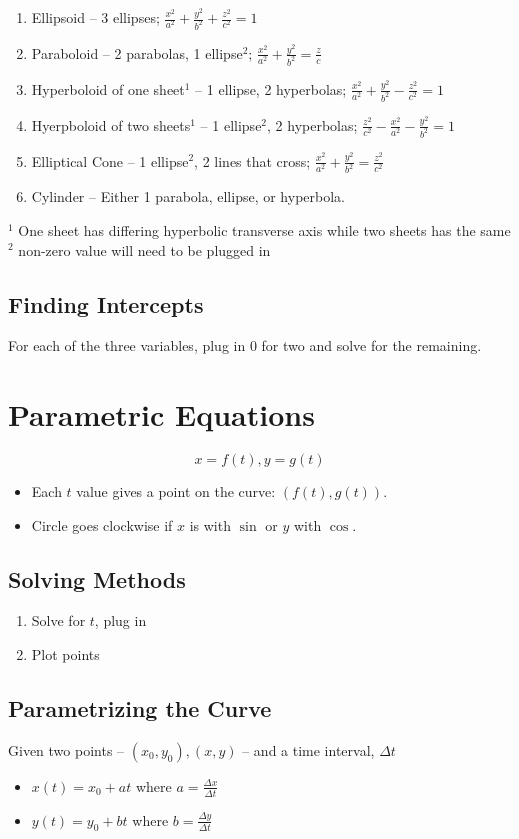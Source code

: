 \documentclass[12pt]{article}
\begin{document}
\begin{enumerate}
    \item Ellipsoid -- 3 ellipses; $\frac{x^2}{a^2}+\frac{y^2}{b^2}+\frac{z^2}{c^2}=1$
    \item Paraboloid -- 2 parabolas, 1 ellipse$^2$; $\frac{x^2}{a^2}+\frac{y^2}{b^2}=\frac{z}{c}$
    \item Hyperboloid of one sheet$^1$ -- 1 ellipse, 2 hyperbolas; $\frac{x^2}{a^2}+\frac{y^2}{b^2}-\frac{z^2}{c^2}=1$
    \item Hyerpboloid of two sheets$^1$ -- 1 ellipse$^2$, 2 hyperbolas; $\frac{z^2}{c^2}-\frac{x^2}{a^2}-\frac{y^2}{b^2}=1$
    \item Elliptical Cone -- 1 ellipse$^2$, 2 lines that cross; $\frac{x^2}{a^2}+\frac{y^2}{b^2}=\frac{z^2}{c^2}$
    \item Cylinder -- Either 1 parabola, ellipse, or hyperbola.
\end{enumerate}
$^1$ One sheet has differing hyperbolic transverse axis while two sheets has the same
\newline
$^2$ non-zero value will need to be plugged in

\subsection{Finding Intercepts}
For each of the three variables, plug in $0$ for two and solve for the remaining.

\section{Parametric Equations}
$$x=f(t), y=g(t)$$
\begin{itemize}
    \item Each $t$ value gives a point on the curve: $(f(t),g(t))$. 
    \item Circle goes clockwise if $x$ is with $\sin$ or $y$ with $\cos$. 
\end{itemize}

\subsection{Solving Methods}
\begin{enumerate}
    \item Solve for $t$, plug in
    \item Plot points
\end{enumerate}

\subsection{Parametrizing the Curve}
Given two points -- $(x_0,y_0), (x,y)$ -- and a time interval, $\Delta t$
\begin{itemize}
    \item $x(t)=x_0 + at$ where $a=\frac{\Delta x}{\Delta t}$
    \item $y(t)=y_0 + bt$ where $b=\frac{\Delta y}{\Delta t}$
\end{itemize}
\end{document}
